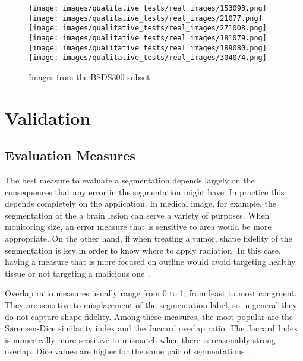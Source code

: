  \begin{figure}[h!]
 	\centering
 	\texttt{[image: images/qualitative\_tests/real\_images/153093.png]}\hspace{0.025\textwidth}%
 	\texttt{[image: images/qualitative\_tests/real\_images/21077.png]}\hspace{0.025\textwidth}%
 	\texttt{[image: images/qualitative\_tests/real\_images/271008.png]}\\[0.2em]
 	
 	\texttt{[image: images/qualitative\_tests/real\_images/181079.png]}\hspace{0.025\textwidth}%
 	\texttt{[image: images/qualitative\_tests/real\_images/189080.png]}\hspace{0.025\textwidth}%
 	\texttt{[image: images/qualitative\_tests/real\_images/304074.png]}\\[0.2em]
 	\caption{Images from the BSDS300 subset}
 	\label{fig:database_bsds300}
 \end{figure}
 

\vspace{1cm}
\section{Validation}
\label{subsec:validation}
\noindent

\subsection{Evaluation Measures}
The best measure to evaluate a segmentation depends largely on the consequences that any error in the segmentation might have. In practice this depends completely on the application. In medical image, for example, the segmentation of the a brain lesion can serve a variety of purposes. When monitoring size, an error measure that is sensitive to area would be more appropriate. On the other hand, if when treating a tumor, shape fidelity of the segmentation is key in order to know where to apply radiation. In this case, having a measure that is more focused on outline would avoid targeting healthy tissue or not targeting a malicious one~\cite{1717643}.

Overlap ratio measures usually range from 0 to 1, from least to most congruent. They are sensitive to misplacement of the segmentation label, so in general they do not capture shape fidelity. Among these measures, the most popular are the S\o rensen-Dice similarity index and the Jaccard overlap ratio. The Jaccard Index is numerically more sensitive to mismatch when there is reasonably strong overlap. Dice values are higher for the same pair of segmentations~\cite{1717643}.

